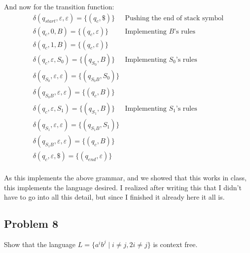\documentclass[english]{article}
\begin{document}
And now for the transition function:
\begin{align*}
\delta(q_{start},\varepsilon,\varepsilon) = \{(q_{c},\$)\} & \textrm{Pushing the end of stack symbol} \\
\delta(q_{c},0,B) = \{(q_{c},\varepsilon)\} & \textrm{Implementing $B$'s rules} \\
\delta(q_{c},1,B) = \{(q_{c},\varepsilon)\}  \\
\delta(q_{c},\varepsilon,S_0) = \{(q_{S_0},B)\} & \textrm{Implementing $S_0$'s rules} \\
\delta(q_{S_0},\varepsilon,\varepsilon) = \{(q_{S_0B},S_0)\}  \\
\delta(q_{S_0B},\varepsilon,\varepsilon) = \{(q_{c},B)\}  \\
\delta(q_{c},\varepsilon,S_1) = \{(q_{S_1},B)\} & \textrm{Implementing $S_1$'s rules} \\
\delta(q_{S_1},\varepsilon,\varepsilon) = \{(q_{S_1B},S_1)\}  \\
\delta(q_{S_1B},\varepsilon,\varepsilon) = \{(q_{c},B)\}  \\
\delta(q_{c},\varepsilon,\$) = \{(q_{end},\varepsilon)\}  \\
\end{align*}

As this implements the above grammar, and we showed that this works in class, this implements the language
desired. I realized after writing this that I didn't have to go into all this detail, but since I finished
it already here it all is.

\subsection*{Problem 8}
Show that the language \(L = \{a^i b^j \mid i \neq j, 2i \neq j\}\) is context free.
\end{document}

